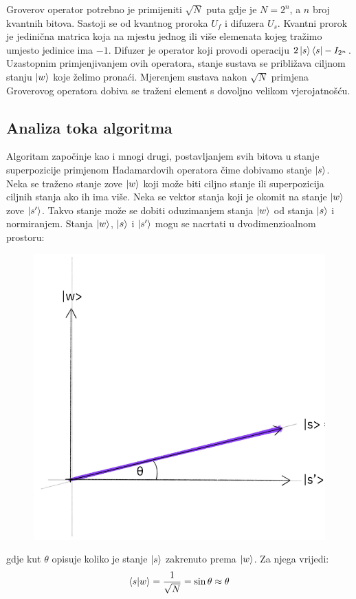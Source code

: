 Groverov operator potrebno je primijeniti $\sqrt{N}$ puta gdje je $N = 2^n$, a $n$ broj kvantnih bitova. Sastoji se od kvantnog proroka  $U_f$ i difuzera  $U_s$. Kvantni prorok je jedinična matrica koja na mjestu jednog ili više elemenata kojeg tražimo umjesto jedinice ima $-1$. Difuzer je operator koji provodi operaciju $2\ket{s}\bra{s} - I_{2^n}$. Uzastopnim primjenjivanjem ovih operatora, stanje sustava se približava ciljnom stanju $\ket{w}$ koje želimo pronaći. Mjerenjem sustava nakon $\sqrt{N}$ primjena Groverovog operatora dobiva se traženi element s dovoljno velikom vjerojatnošću.

\subsection{Analiza toka algoritma}

Algoritam započinje kao i mnogi drugi, postavljanjem svih bitova u stanje superpozicije primjenom Hadamardovih operatora čime dobivamo stanje $\ket{s}$. Neka se traženo stanje zove $\ket{w}$ koji može biti ciljno stanje ili superpozicija ciljnih stanja ako ih ima više. Neka se vektor stanja koji je okomit na stanje $\ket{w}$ zove $\ket{s'}$. Takvo stanje može se dobiti oduzimanjem stanja $\ket{w}$ od stanja $\ket{s}$ i normiranjem. Stanja $\ket{w}$, $\ket{s}$ i $\ket{s'}$ mogu se nacrtati u dvodimenzioalnom prostoru:

\begin{figure}[H]
\centering
\includegraphics[scale=0.4]{img/grover1.png}
\end{figure}
gdje kut $\theta$ opisuje koliko je stanje $\ket{s}$ zakrenuto prema $\ket{w}$. Za njega vrijedi:
\[
\braket{s|w} = \frac{1}{\sqrt{N}} = \sin\theta \approx \theta
\]

